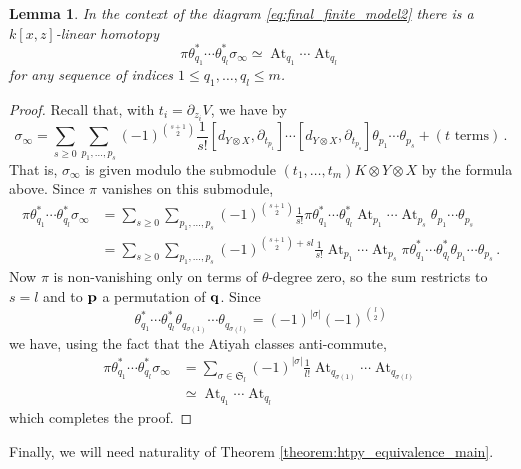 \documentclass[english,letter paper,12pt,leqno]{article}
\newtheorem{lemma}[theorem]{Lemma}
\theoremstyle{example}
\numberwithin{equation}{section}
\DeclareMathOperator{\At}{At}
\begin{document}
\begin{lemma}\label{lemma:transfercreations} In the context of the diagram \eqref{eq:final_finite_model2} there is a $k[x,z]$-linear homotopy
\[
\pi \theta_{q_1}^* \cdots \theta_{q_l}^* \sigma_\infty \simeq \At_{q_1} \cdots \At_{q_l}
\]
for any sequence of indices $1 \le q_1,\ldots,q_l \le m$.
\end{lemma}
\begin{proof}
Recall that, with $t_i = \partial_{z_i} V$, we have by \cite[Section 10]{dm1102.2957}
\begin{equation}\label{eq:atiyah_formula_sigma}
\sigma_\infty = \sum_{s \ge 0} \sum_{p_1,\ldots,p_s} (-1)^{\binom{s+1}{2}} \frac{1}{s!} [ d_{Y \otimes X}, \partial_{t_{p_1}}] \cdots [ d_{Y \otimes X}, \partial_{t_{p_s}}] \theta_{p_1} \cdots \theta_{p_s} + (t \text{ terms})\,.
\end{equation}
That is, $\sigma_\infty$ is given modulo the submodule $(t_1,\ldots,t_m) K \otimes Y \otimes X$ by the formula above. Since $\pi$ vanishes on this submodule,
\begin{align*}
\pi \theta_{q_1}^* \cdots \theta_{q_l}^* \sigma_\infty &= \sum_{s \ge 0} \sum_{p_1,\ldots,p_s} (-1)^{\binom{s+1}{2}} \frac{1}{s!} \pi \theta_{q_1}^* \cdots \theta_{q_l}^* \At_{p_1} \cdots \At_{p_s} \theta_{p_1} \cdots \theta_{p_s}\\
&= \sum_{s \ge 0} \sum_{p_1,\ldots,p_s} (-1)^{\binom{s+1}{2} + sl} \frac{1}{s!} \At_{p_1} \cdots \At_{p_s} \pi \theta_{q_1}^* \cdots \theta_{q_l}^* \theta_{p_1} \cdots \theta_{p_s}\,.
\end{align*}
Now $\pi$ is non-vanishing only on terms of $\theta$-degree zero, so the sum restricts to $s = l$ and to $\bold{p}$ a permutation of $\bold{q}$. Since
\[
\theta_{q_1}^* \cdots \theta_{q_l}^* \theta_{q_{\sigma(1)}} \cdots \theta_{q_{\sigma(l)}} = (-1)^{|\sigma|} (-1)^{\binom{l}{2}}
\]
we have, using the fact that the Atiyah classes anti-commute,
\begin{align*}
\pi \theta_{q_1}^* \cdots \theta_{q_l}^* \sigma_\infty &= \sum_{\sigma \in \mathfrak{S}_l} (-1)^{|\sigma|} \frac{1}{l!} \At_{q_{\sigma(1)}} \cdots \At_{q_{\sigma(l)}}\\
&\simeq \At_{q_1} \cdots \At_{q_l}
\end{align*}
which completes the proof.
\end{proof}

Finally, we will need naturality of Theorem \ref{theorem:htpy_equivalence_main}.
\end{document}
